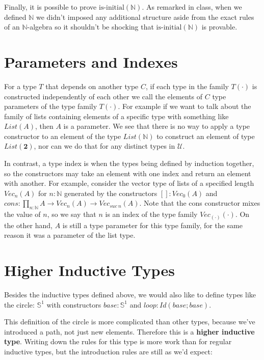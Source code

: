 \documentclass[11pt]{article}
\newcommand{\N}{\mathbb{N}}
\newcommand{\2}{\textbf{2}}
\newcommand{\Sp}{\mathbb{S}^1}
\begin{document}
Finally, it is possible to prove $\text{is-initial}(\N)$. As remarked in class, when we defined $\N$ we didn't imposed any additional structure aside from the exact rules of an $\N$-algebra so it shouldn't be shocking that $\text{is-initial}(\N)$ is provable.



\section{Parameters and Indexes}

For a type $T$ that depends on another type $C$, if each type in the family $T(\cdot)$ is constructed independently of each other we call the elements of $C$ type parameters of the type family $T(\cdot)$.
For example if we want to talk about the family of lists containing elements of a specific type with something like $List(A)$, then $A$ is a parameter.
We see that there is no way to apply a type constructor to an element of the type $List(\N)$ to construct an element of type $List(\2)$, nor can we do that for any distinct types in $\mathcal{U}$.

In contrast, a type index is when the types being defined by induction together, so the constructors may take an element with one index and return an element with another.
For example, consider the vector type of lists of a specified length $Vec_n(A)$ for $n : \N$ generated by the constructors $[] : Vec_0(A)$ and $cons : \prod_{n : \N} A \rightarrow Vec_n(A) \rightarrow Vec_{suc\ n}(A)$.
Note that the cons constructor mixes the value of $n$, so we say that $n$ is an index of the type family $Vec_{(\cdot)}(\cdot)$.
On the other hand, $A$ is still a type parameter for this type family, for the same reason it was a parameter of the list type.


\section{Higher Inductive Types}
Besides the inductive types defined above, we would also like to define types like the circle:
  $\Sp$ with constructors $base : \Sp$ and $loop : Id(base ; base)$.

This definition of the circle is more complicated than other types, because we've introduced a path, not just new elements.
Therefore this is a \textbf{higher inductive type}.
Writing down the rules for this type is more work than for regular inductive types, but the introduction rules are still as we'd expect:
\end{document}
